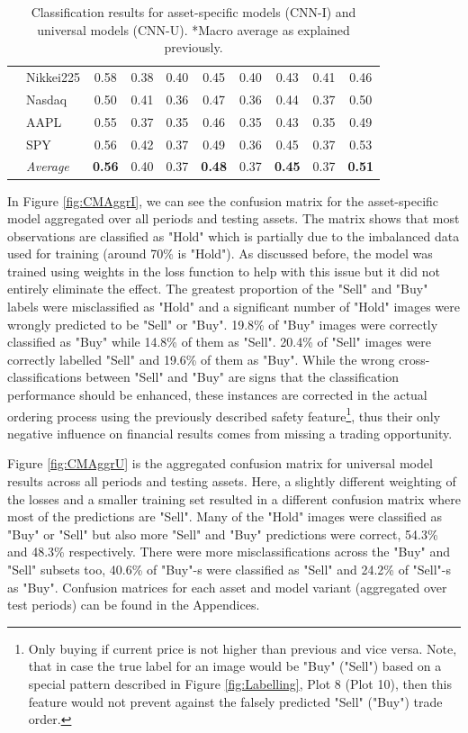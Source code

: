\documentclass[11pt, a4paper]{article}
\begin{document}
\begin{table}[H]
\begin{tabular}{l|l|cc|cc|cc|cc}
& Nikkei225        & 0.58          & 0.38 & 0.40 & 0.45          & 0.40 & 0.43          & 0.41 & 0.46          \\
& Nasdaq           & 0.50          & 0.41 & 0.36 & 0.47          & 0.36 & 0.44          & 0.37 & 0.50          \\
& AAPL             & 0.55          & 0.37 & 0.35 & 0.46          & 0.35 & 0.43          & 0.35 & 0.49          \\
& SPY              & 0.56          & 0.42 & 0.37 & 0.49          & 0.36 & 0.45          & 0.37 & 0.53          \\ \cline{2-10}
& \textit{Average} & \textbf{0.56} & 0.40 & 0.37 & \textbf{0.48} & 0.37 & \textbf{0.45} & 0.37 & \textbf{0.51}
\end{tabular}
\caption{Classification results for asset-specific models (CNN-I) and universal models (CNN-U). *Macro average as explained previously.}
\label{tbl:ClassRes}
\end{table}

In Figure \ref{fig:CMAggrI}, we can see the confusion matrix for the asset-specific model aggregated over all periods and testing assets. The matrix shows that most observations are classified as "Hold" which is partially due to the imbalanced data used for training (around 70\% is "Hold"). As discussed before, the model was trained using weights in the loss function to help with this issue but it did not entirely eliminate the effect. The greatest proportion of the "Sell" and "Buy" labels were misclassified as "Hold" and a significant number of "Hold" images were wrongly predicted to be "Sell" or "Buy". 19.8\% of "Buy" images were correctly classified as "Buy" while 14.8\% of them as "Sell". 20.4\% of "Sell" images were correctly labelled "Sell" and 19.6\% of them as "Buy". While the wrong cross-classifications between "Sell" and "Buy" are signs that the classification performance should be enhanced, these instances are corrected in the actual ordering process using the previously described safety feature\footnote{Only buying if current price is not higher than previous and vice versa. Note, that in case the true label for an image would be "Buy" ("Sell") based on a special pattern described in Figure \ref{fig:Labelling}, Plot 8 (Plot 10), then this feature would not prevent against the falsely predicted "Sell" ("Buy") trade order.}, thus their only negative influence on financial results comes from missing a trading opportunity.

Figure \ref{fig:CMAggrU} is the aggregated confusion matrix for universal model results across all periods and testing assets. Here, a slightly different weighting of the losses and a smaller training set resulted in a different confusion matrix where most of the predictions are "Sell". Many of the "Hold" images were classified as "Buy" or "Sell" but also more "Sell" and "Buy" predictions were correct, 54.3\% and 48.3\% respectively. There were more misclassifications across the "Buy" and "Sell" subsets too, 40.6\% of "Buy"-s were classified as "Sell" and 24.2\% of "Sell"-s as "Buy". Confusion matrices for each asset and model variant (aggregated over test periods) can be found in the Appendices.
\end{document}

